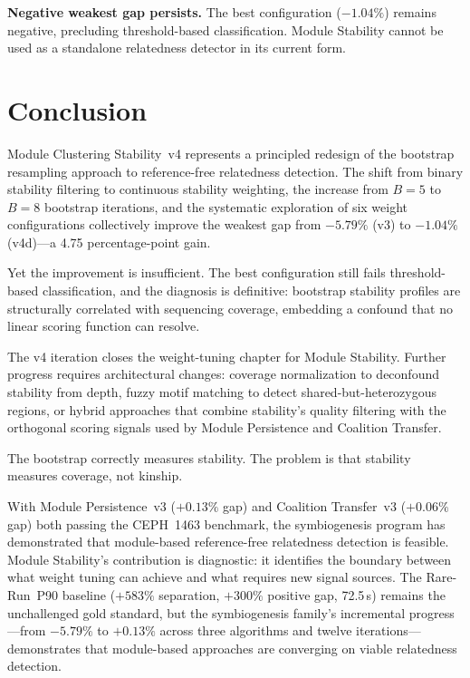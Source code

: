 \documentclass{../yalumba}
\begin{document}
\begin{limitation}
\textbf{Negative weakest gap persists.}  The best configuration ($-1.04\%$)
remains negative, precluding threshold-based classification.  Module Stability
cannot be used as a standalone relatedness detector in its current form.
\end{limitation}


\section{Conclusion}
\label{sec:conclusion}

Module Clustering Stability~v4 represents a principled redesign of the
bootstrap resampling approach to reference-free relatedness detection.  The
shift from binary stability filtering to continuous stability weighting, the
increase from $B = 5$ to $B = 8$ bootstrap iterations, and the systematic
exploration of six weight configurations collectively improve the weakest gap
from $-5.79\%$ (v3) to $-1.04\%$ (v4d)---a 4.75 percentage-point gain.


Yet the improvement is insufficient.  The best configuration still fails
threshold-based classification, and the diagnosis is definitive: bootstrap
stability profiles are structurally correlated with sequencing coverage,
embedding a confound that no linear scoring function can resolve.

The v4 iteration closes the weight-tuning chapter for Module Stability.
Further progress requires architectural changes: coverage normalization to
deconfound stability from depth, fuzzy motif matching to detect
shared-but-heterozygous regions, or hybrid approaches that combine stability's
quality filtering with the orthogonal scoring signals used by Module
Persistence and Coalition Transfer.

\begin{pullquote}
The bootstrap correctly measures stability.  The problem is that stability
measures coverage, not kinship.
\end{pullquote}

With Module Persistence~v3 ($+0.13\%$ gap) and Coalition Transfer~v3
($+0.06\%$ gap) both passing the CEPH~1463 benchmark, the symbiogenesis
program has demonstrated that module-based reference-free relatedness detection
is feasible.  Module Stability's contribution is diagnostic: it identifies the
boundary between what weight tuning can achieve and what requires new signal
sources.  The Rare-Run~P90 baseline ($+583\%$ separation, $+300\%$ positive
gap, 72.5\,s) remains the unchallenged gold standard, but the symbiogenesis
family's incremental progress---from $-5.79\%$ to $+0.13\%$ across three
algorithms and twelve iterations---demonstrates that module-based approaches
are converging on viable relatedness detection.





\end{document}
